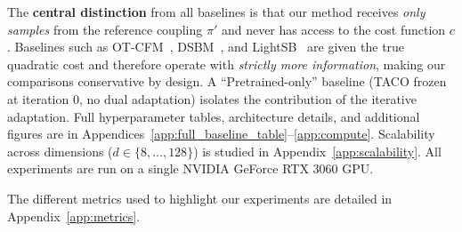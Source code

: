 \documentclass[11pt]{article}
\theoremstyle{definition}
\numberwithin{equation}{section}%
\begin{document}
The \textbf{central distinction} from all baselines is that our method
receives \emph{only samples} from the reference coupling $\pi'$ and never
has access to the cost function $c$.
Baselines such as OT-CFM~\citep{tong2023improving},
DSBM~\citep{shi2023diffusion}, and LightSB~\citep{korotin2024light}
are given the true quadratic cost and therefore operate with
\emph{strictly more information}, making our comparisons conservative by
design.
A ``Pretrained-only'' baseline (TACO frozen at iteration 0, no dual
adaptation) isolates the contribution of the iterative adaptation.
Full hyperparameter tables, architecture details, and additional figures
are in Appendices~\ref{app:full_baseline_table}--\ref{app:compute}.
Scalability across dimensions ($d \in \{8,\ldots,128\}$) is studied in Appendix~\ref{app:scalability}.
All experiments are run on a single NVIDIA GeForce RTX 3060 GPU.

The different metrics used to highlight our experiments are detailed in Appendix~\ref{app:metrics}.



\end{document}
